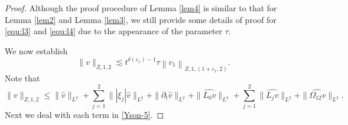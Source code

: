 \documentclass[11pt,twoside]{article}
\newcommand{\p}{\partial}
\theoremstyle{plain}
\theoremstyle{definition}
\theoremstyle{remark}
\numberwithin{equation}{section}
\begin{document}
\begin{proof}
Although the proof procedure of Lemma \ref{lem4} is similar to that for  Lemma \ref{lem2} and Lemma \ref{lem3},
we still provide some details of proof for \eqref{equ:l3} and \eqref{equ:l4} due to  the appearance of the parameter $\tau$.

We now establish
$$
\|v\|_{Z, 1, 2} \lesssim t^{\delta(\varepsilon_1)-1}\tau\left\|v_1\right\|_{Z, 1,(1+\varepsilon_1, 2)}.
$$
Note that
\begin{equation}\label{Yson-5}
\|v\|_{Z, 1, 2} \leq \|\hat{v}\|_{L^2}+\sum_{j=1}^2\||\xi_j|\hat{v}\|_{L^2}+\|\p_t\hat{v}\|_{L^2}+\|\widehat{L_0v}\|_{L^2}
+\sum_{j=1}^2\|\widehat{L_jv}\|_{L^2}+\|\widehat{\Omega_{12}v}\|_{L^2}.
\end{equation}
Next we deal with each term in \eqref{Yson-5}.


\end{proof}
\end{document}
